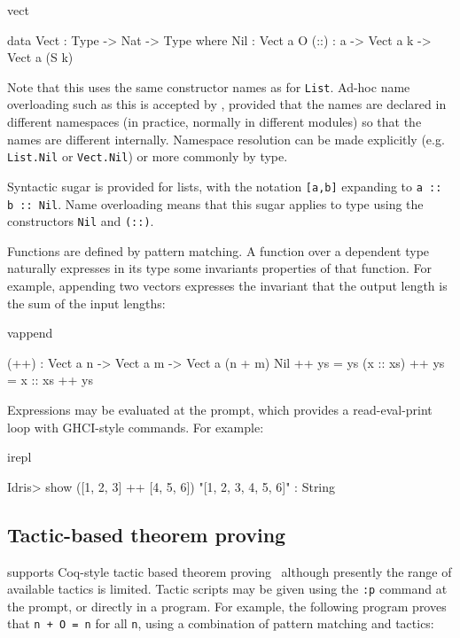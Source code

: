 \begin{SaveVerbatim}{vect}

data Vect : Type -> Nat -> Type where
   Nil  : Vect a O
   (::) : a -> Vect a k -> Vect a (S k)

\end{SaveVerbatim}

\noindent
Note that this uses the same constructor names as for \texttt{List}. Ad-hoc name
overloading such as this is accepted by \Idris{}, provided that the names are
declared in different namespaces (in practice, normally in different modules)
so that the names are different internally. Namespace resolution can be made
explicitly (e.g. \texttt{List.Nil} or \texttt{Vect.Nil}) or more commonly
by type.

Syntactic sugar is provided for lists, with the notation \texttt{[a,b]}
expanding to \texttt{a :: b :: Nil}. Name overloading means that this
sugar applies to  type using the constructors \texttt{Nil}
and \texttt{(::)}.

Functions are defined by pattern matching. A function over a dependent type
naturally expresses in its type some invariants properties of that function.
For example, appending two vectors expresses the invariant that the output
length is the sum of the input lengths:

\begin{SaveVerbatim}{vappend}

(++) : Vect a n -> Vect a m -> Vect a (n + m)
Nil       ++ ys = ys
(x :: xs) ++ ys = x :: xs ++ ys

\end{SaveVerbatim}

\noindent
Expressions may be evaluated at the \Idris{} prompt, which provides a 
read-eval-print loop with GHCI-style commands. For example:

\begin{SaveVerbatim}{irepl}

Idris> show ([1, 2, 3] ++ [4, 5, 6])
"[1, 2, 3, 4, 5, 6]" : String

\end{SaveVerbatim}

\subsection{Tactic-based theorem proving}

\Idris{} supports Coq-style tactic based theorem proving~\cite{Bertot2004}
although presently the range of available tactics is limited. Tactic scripts
may be given using the \texttt{:p} command at the \Idris{} prompt, or directly
in a program. For example, the following program proves that \texttt{n + O = n}
for all \texttt{n}, using a combination of pattern matching and tactics:

